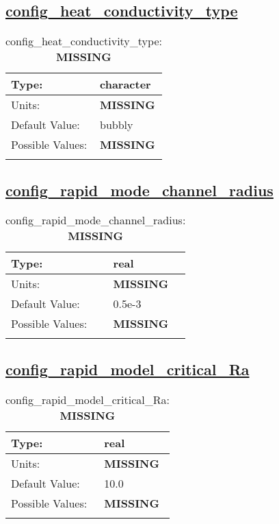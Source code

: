 \subsection[config\_heat\_conductivity\_type]{\hyperref[sec:nm_tab_thermodynamics]{config\_heat\_conductivity\_type}}
\label{subsec:nm_sec_config_heat_conductivity_type}
\begin{center}
\begin{longtable}{| p{2.0in} || p{4.0in} |}
    \hline
    Type: & character \\
    \hline
    Units: & {\bf \color{red} MISSING} \\
    \hline
    Default Value: & bubbly \\
    \hline
    Possible Values: & {\bf \color{red} MISSING} \\
    \hline
    \caption{config\_heat\_conductivity\_type: {\bf \color{red} MISSING}}
\end{longtable}
\end{center}
\subsection[config\_rapid\_mode\_channel\_radius]{\hyperref[sec:nm_tab_thermodynamics]{config\_rapid\_mode\_channel\_radius}}
\label{subsec:nm_sec_config_rapid_mode_channel_radius}
\begin{center}
\begin{longtable}{| p{2.0in} || p{4.0in} |}
    \hline
    Type: & real \\
    \hline
    Units: & {\bf \color{red} MISSING} \\
    \hline
    Default Value: & 0.5e-3 \\
    \hline
    Possible Values: & {\bf \color{red} MISSING} \\
    \hline
    \caption{config\_rapid\_mode\_channel\_radius: {\bf \color{red} MISSING}}
\end{longtable}
\end{center}
\subsection[config\_rapid\_model\_critical\_Ra]{\hyperref[sec:nm_tab_thermodynamics]{config\_rapid\_model\_critical\_Ra}}
\label{subsec:nm_sec_config_rapid_model_critical_Ra}
\begin{center}
\begin{longtable}{| p{2.0in} || p{4.0in} |}
    \hline
    Type: & real \\
    \hline
    Units: & {\bf \color{red} MISSING} \\
    \hline
    Default Value: & 10.0 \\
    \hline
    Possible Values: & {\bf \color{red} MISSING} \\
    \hline
    \caption{config\_rapid\_model\_critical\_Ra: {\bf \color{red} MISSING}}
\end{longtable}
\end{center}
